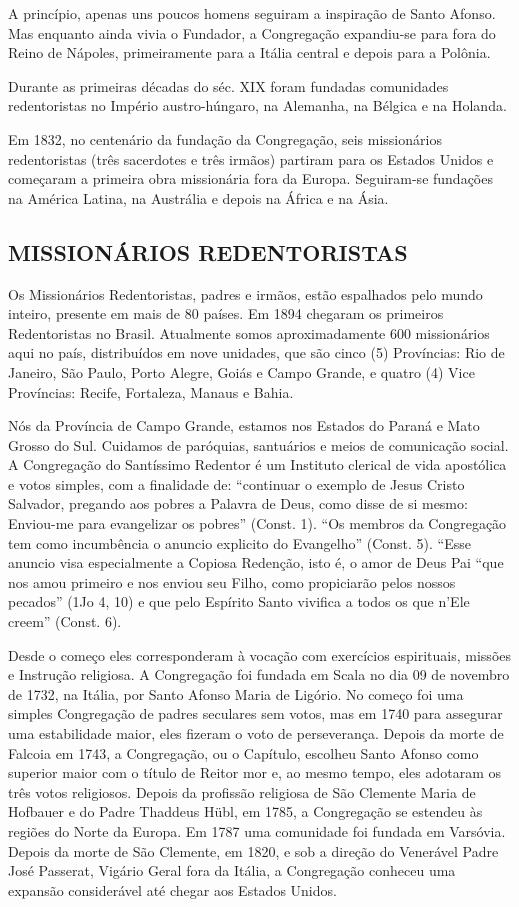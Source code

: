 \documentclass[a4paper,14pt,twoside]{extarticle} \usepackage[utf8]{inputenc}
\begin{document}
A princípio, apenas uns poucos homens seguiram a inspiração de Santo Afonso. Mas enquanto ainda vivia o Fundador, a Congregação expandiu-se para fora do Reino de Nápoles, primeiramente para a Itália central e depois para a Polônia.

Durante as primeiras décadas do séc. XIX foram fundadas comunidades redentoristas no Império austro-húngaro, na Alemanha, na Bélgica e na Holanda.

Em 1832, no centenário da fundação da Congregação, seis missionários redentoristas (três sacerdotes e três irmãos) partiram para os Estados Unidos e começaram a primeira obra missionária fora da Europa. Seguiram-se fundações na América Latina, na Austrália e depois na África e na Ásia.

 
\subsection{MISSIONÁRIOS REDENTORISTAS}

Os Missionários Redentoristas, padres e irmãos, estão espalhados pelo mundo inteiro, presente em mais de 80 países. Em 1894 chegaram os primeiros Redentoristas no Brasil. Atualmente somos aproximadamente 600 missionários aqui no país, distribuídos em nove unidades, que são cinco (5) Províncias: Rio de Janeiro, São Paulo, Porto Alegre, Goiás e Campo Grande, e quatro (4) Vice Províncias: Recife, Fortaleza, Manaus e Bahia.

Nós da Província de Campo Grande, estamos nos Estados do Paraná e Mato Grosso do Sul. Cuidamos de paróquias, santuários e meios de comunicação social. A Congregação do Santíssimo Redentor é um Instituto clerical de vida apostólica e votos simples, com a finalidade de: “continuar o exemplo de Jesus Cristo Salvador, pregando aos pobres a Palavra de Deus, como disse de si mesmo: Enviou-me para evangelizar os pobres” (Const. 1). “Os membros da Congregação tem como incumbência o anuncio explicito do Evangelho” (Const. 5). “Esse anuncio visa especialmente a Copiosa Redenção, isto é, o amor de Deus Pai “que nos amou primeiro e nos enviou seu Filho, como propiciarão pelos nossos pecados” (1Jo 4, 10) e que pelo Espírito Santo vivifica a todos os que n’Ele creem” (Const. 6).

Desde o começo eles corresponderam à vocação com exercícios espirituais, missões e Instrução religiosa. A Congregação foi fundada em Scala no dia 09 de novembro de 1732, na Itália, por Santo Afonso Maria de Ligório. No começo foi uma simples Congregação de padres seculares sem votos, mas em 1740 para assegurar uma estabilidade maior, eles fizeram o voto de perseverança. Depois da morte de Falcoia em 1743, a Congregação, ou o Capítulo, escolheu Santo Afonso como superior maior com o título de Reitor mor e, ao mesmo tempo, eles adotaram os três votos religiosos. Depois da profissão religiosa de São Clemente Maria de Hofbauer e do Padre Thaddeus Hübl, em 1785, a Congregação se estendeu às regiões do Norte da Europa. Em 1787 uma comunidade foi fundada em Varsóvia. Depois da morte de São Clemente, em 1820, e sob a direção do Venerável Padre José Passerat, Vigário Geral fora da Itália, a Congregação conheceu uma expansão considerável até chegar aos Estados Unidos.
\end{document}
